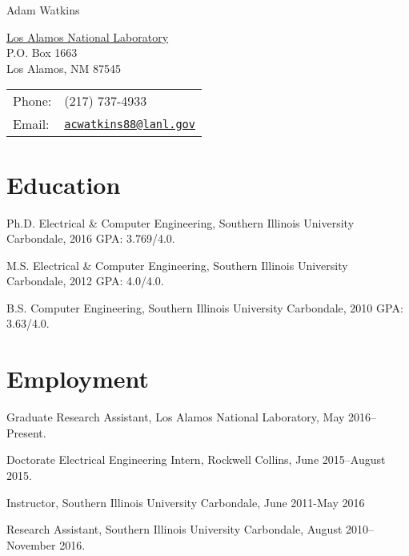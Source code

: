 \documentclass[letterpaper]{article}
\def\name{Adam Watkins}
\renewenvironment{itemize}{
  \begin{list}{}{
    \setlength{\leftmargin}{1.5em}
  }
}{
  \end{list}
}
\begin{document}
{\huge \name}


\vspace{0.25in}

\begin{minipage}{0.45\linewidth}
  \href{}{Los Alamos National Laboratory} \\
  P.O. Box 1663  \\
  Los Alamos, NM 87545
\end{minipage}
\begin{minipage}{0.45\linewidth}
  \begin{tabular}{ll}
    Phone: & (217) 737-4933 \\
    Email: & \href{mailto:acwatkins88@lanl.gov}{\tt acwatkins88@lanl.gov} \\
  \end{tabular}
\end{minipage}


\section*{Education}

\begin{itemize}
	
\item Ph.D. Electrical \& Computer Engineering, Southern Illinois University Carbondale, 2016 GPA: 3.769/4.0.
 
\item M.S. Electrical \& Computer Engineering, Southern Illinois University Carbondale, 2012 GPA: 4.0/4.0.

\item B.S. Computer Engineering, Southern Illinois University Carbondale, 2010 GPA: 3.63/4.0.

\end{itemize}


\section*{Employment}

\begin{itemize}
\item Graduate Research Assistant, Los Alamos National Laboratory, May 2016--Present.
\item Doctorate Electrical Engineering Intern, Rockwell Collins, June 2015--August 2015.
\item Instructor, Southern Illinois University Carbondale, June 2011-May 2016
\item Research Assistant, Southern Illinois University Carbondale, August 2010--November 2016.
\end{itemize}
\end{document}
